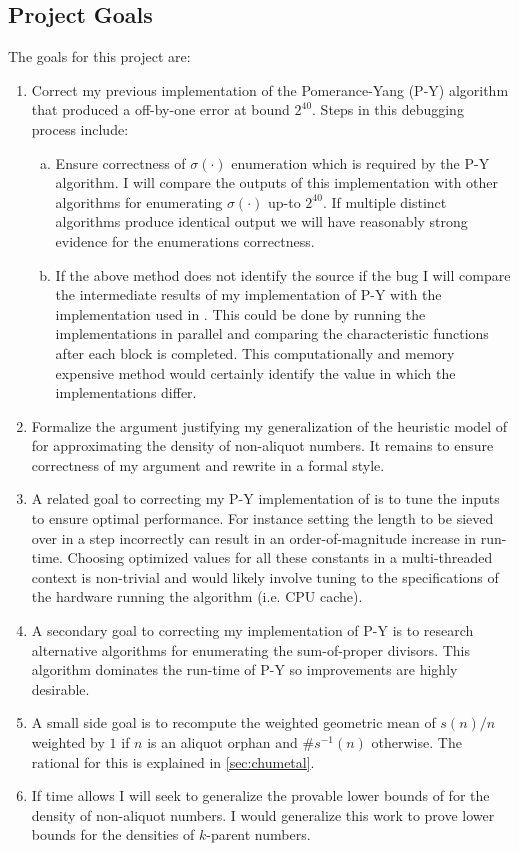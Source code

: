 \documentclass{article}
\theoremstyle{definition}
\begin{document}
\subsection{Project Goals}
The goals for this project are: \begin{enumerate}
    \item Correct my previous implementation of the Pomerance-Yang (P-Y) algorithm \cite{pomYang} that produced a off-by-one error at bound $2^{40}$. Steps in this debugging process include: \begin{enumerate}[(a)]
        \item Ensure correctness of $\sigma(\cdot)$ enumeration which is required by the P-Y algorithm. I will compare the outputs of this implementation with other algorithms for enumerating $\sigma(\cdot)$ up-to $2^{40}$. If multiple distinct algorithms produce identical output we will have reasonably strong evidence for the enumerations correctness.
        \item If the above method does not identify the source if the bug I will compare the intermediate results of my implementation of P-Y with the implementation used in \cite{chum_guy_jacobson_mosunov_2018}. This could be done by running the implementations in parallel and comparing the characteristic functions after each block is completed. This computationally and memory expensive method would certainly identify the value in which the implementations differ. 
    \end{enumerate}
    \item Formalize the argument justifying my generalization of the heuristic model of \cite{pollPom} for approximating the density of non-aliquot numbers. It remains to ensure correctness of my argument and rewrite in a formal style.
    \item A related goal to correcting my P-Y implementation of is to tune the inputs to ensure optimal performance. For instance setting the length to be sieved over in a step incorrectly can result in an order-of-magnitude increase in run-time. Choosing optimized values for all these constants in a multi-threaded context is non-trivial and would likely involve tuning to the specifications of the hardware running the algorithm (i.e. CPU cache).
    \item A secondary goal to correcting my implementation of P-Y is to research alternative algorithms for enumerating the sum-of-proper divisors. This algorithm dominates the run-time of P-Y so improvements are highly desirable.
    \item A small side goal is to recompute the weighted geometric mean of $s(n)/n$ weighted by $1$ if $n$ is an aliquot orphan and $\#s^{-1}(n)$ otherwise. The rational for this is explained in \autoref{sec:chumetal}.
    \item If time allows I will seek to generalize the provable lower bounds of \cite{chen_zhao_2011} for the density of non-aliquot numbers. I would generalize this work to prove lower bounds for the densities of $k$-parent numbers.
\end{enumerate}
\end{document}
